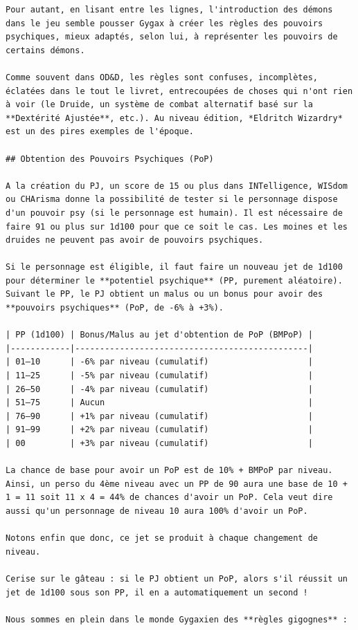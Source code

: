 \documentclass[12pt]{article}
\begin{document}
{\begin{verbatim}
Pour autant, en lisant entre les lignes, l'introduction des démons dans le jeu semble pousser Gygax à créer les règles des pouvoirs psychiques, mieux adaptés, selon lui, à représenter les pouvoirs de certains démons.

Comme souvent dans OD&D, les règles sont confuses, incomplètes, éclatées dans le tout le livret, entrecoupées de choses qui n'ont rien à voir (le Druide, un système de combat alternatif basé sur la **Dextérité Ajustée**, etc.). Au niveau édition, *Eldritch Wizardry* est un des pires exemples de l'époque.

## Obtention des Pouvoirs Psychiques (PoP)

A la création du PJ, un score de 15 ou plus dans INTelligence, WISdom ou CHArisma donne la possibilité de tester si le personnage dispose d'un pouvoir psy (si le personnage est humain). Il est nécessaire de faire 91 ou plus sur 1d100 pour que ce soit le cas. Les moines et les druides ne peuvent pas avoir de pouvoirs psychiques.

Si le personnage est éligible, il faut faire un nouveau jet de 1d100 pour déterminer le **potentiel psychique** (PP, purement aléatoire). Suivant le PP, le PJ obtient un malus ou un bonus pour avoir des **pouvoirs psychiques** (PoP, de -6% à +3%).

| PP (1d100) | Bonus/Malus au jet d'obtention de PoP (BMPoP) |
|------------|-----------------------------------------------|
| 01–10      | -6% par niveau (cumulatif)                    |
| 11–25      | -5% par niveau (cumulatif)                    |
| 26–50      | -4% par niveau (cumulatif)                    |
| 51–75      | Aucun                                         |
| 76–90      | +1% par niveau (cumulatif)                    |
| 91–99      | +2% par niveau (cumulatif)                    |
| 00         | +3% par niveau (cumulatif)                    |

La chance de base pour avoir un PoP est de 10% + BMPoP par niveau. Ainsi, un perso du 4ème niveau avec un PP de 90 aura une base de 10 + 1 = 11 soit 11 x 4 = 44% de chances d'avoir un PoP. Cela veut dire aussi qu'un personnage de niveau 10 aura 100% d'avoir un PoP.

Notons enfin que donc, ce jet se produit à chaque changement de niveau.

Cerise sur le gâteau : si le PJ obtient un PoP, alors s'il réussit un jet de 1d100 sous son PP, il en a automatiquement un second !

Nous sommes en plein dans le monde Gygaxien des **règles gigognes** :


\end{verbatim}}
\end{document}
